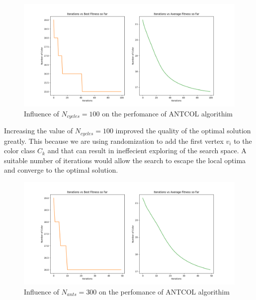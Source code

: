 \documentclass[a4paper]{article}
\begin{document}
\newpage

\begin{center}
    \begin{figure}[h]
    \centering
    \includegraphics[width=12cm]{Figures/fig10.png}
    \caption{Influence of $N_{cycles} = 100$ on the perfomance of ANTCOL algorithim}
    \end{figure}
\end{center}
Increasing the value of $N_{cycles}=100$ improved the quality of the optimal solution greatly. This because we are using randomization to add the first vertex $v_i$ to the color class $C_k$ and that can result in ineffecient 
exploring of the search space. A suitable number of iterations would allow the search to escape the local optima and converge to the optimal solution.
\begin{center}
    \begin{figure}[h]
    \centering
    \includegraphics[width=12cm]{Figures/fig11.png}
    \caption{Influence of $N_{ants} = 300$ on the perfomance of ANTCOL algorithim}
    \end{figure}
\end{center}
\end{document}
